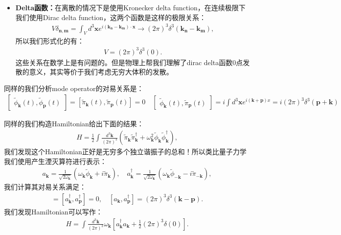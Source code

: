 \begin{itemize}
\begin{align}
    \end{align}
    逆变换也是同理。
  \item \textbf{Delta函数：}在离散的情况下是使用Kronecker delta
    function，在连续极限下我们使用Dirac delta function，这两个函数是这样的极限关系：
    \begin{align}
      V\delta_{\mathbf{n},\mathbf{m}}=\int_{V}d^{3}\mathbf{x}e^{i(\mathbf{k_{n}-k_{m}})\cdot\mathbf{x}}\to(2\pi)^{3}\delta^{3}(\mathbf{k_{n}-k_{m}}),
    \end{align}
    所以我们形式化的有：
    \begin{align}
      V=(2\pi)^3\delta^3(0).
    \end{align}
    这些关系在数学上是有问题的。但是物理上帮我们理解了dirac delta函数0点发散的意义，其实等价于我们考虑无穷大体积的发散。
\end{itemize}

\bigskip
{}

同样的我们分析mode operator的对易关系是：
\begin{align}
  \begin{bmatrix}\tilde{\phi}_{\mathbf{k}}(t),\tilde{\phi}_{\mathbf{p}}(t)
  \end{bmatrix}=[\tilde{\pi}_{\mathbf{k}}(t),\tilde{\pi}_{\mathbf{p}}(t)]=0\quad
  \begin{bmatrix}\tilde{\phi}_{\mathbf{k}}(t),\tilde{\pi}_{\mathbf{p}}(t)
  \end{bmatrix}=i\int
  d^3\mathbf{x}e^{i(\mathbf{k+p})x}=i(2\pi)^3\delta^3(\mathbf{p+k})
\end{align}

\bigskip
{}

同样的我们构造Hamiltonian给出下面的结果：
\begin{align}
  H=\frac{1}{2}\int\frac{d^3\mathbf{k}}{(2\pi)^3}\left(\tilde{\pi}_{\mathbf{k}}\tilde{\pi}_{\mathbf{k}}^{\dagger}+\omega_{\mathbf{k}}^2\tilde{\phi}_{\mathbf{k}}\tilde{\phi}_{\mathbf{k}}^{\dagger}\right),
\end{align}
我们发现这个Hamiltonian正好是无穷多个独立谐振子的总和！所以类比量子力学我们使用产生湮灭算符进行表示：
\begin{align}
  a_{\mathbf{k}}=\frac{1}{\sqrt{2\omega_{\mathbf{k}}}}\left(\omega_{\mathbf{k}}\tilde{\phi}_{\mathbf{k}}+i\tilde{\pi}_{\mathbf{k}}\right),\quad
  a_{\mathbf{k}}^{\dagger}=\frac{1}{\sqrt{2\omega_{\mathbf{k}}}}\left(\omega_{\mathbf{k}}\tilde{\phi}_{-\mathbf{k}}-i\tilde{\pi}_{-\mathbf{k}}\right),
\end{align}
我们计算其对易关系满足：
\begin{align}
  [a_{\mathbf{k}},a_{\mathbf{p}}]=[a_{\mathbf{k}}^{\dagger},a_{\mathbf{p}}^{\dagger}]=0,\quad[a_{\mathbf{k}},a_{\mathbf{p}}^{\dagger}]=(2\pi)^3\delta^3(\mathbf{k-p}).
\end{align}
我们发现Hamiltonian可以写作：
\begin{align}
  H=\int\frac{d^3\mathbf{k}}{(2\pi)^3}\omega_\mathbf{k}\left[a_\mathbf{k}^\dagger
  a_\mathbf{k}+\frac{1}{2}(2\pi)^3\delta(0)\right].
\end{align}

